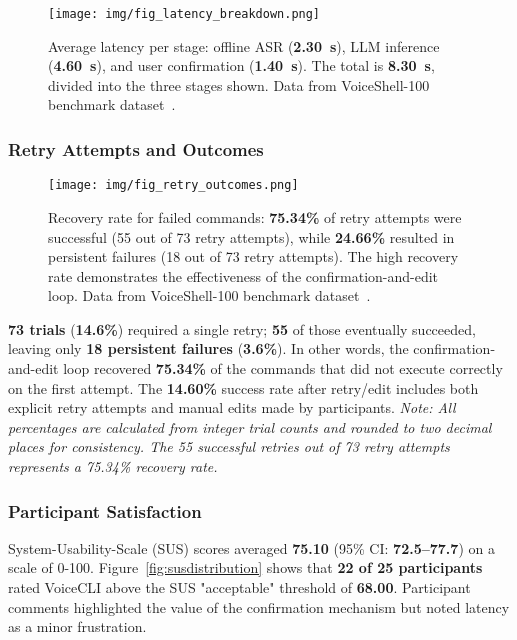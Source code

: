 \documentclass[a4paper,12pt]{article}
\begin{document}
\begin{figure}[htbp]
  \centering
  \texttt{[image: img/fig\_latency\_breakdown.png]}
  \caption{Average latency per stage: offline ASR (\textbf{2.30~s}), LLM inference (\textbf{4.60~s}), and user confirmation (\textbf{1.40~s}). The total is \textbf{8.30~s}, divided into the three stages shown. Data from VoiceShell-100 benchmark dataset~\cite{ref26,ref27}.}
  \label{fig:latencybreakdown}
\end{figure}

\subsubsection{Retry Attempts and Outcomes}

\begin{figure}[htbp]
  \centering
  \texttt{[image: img/fig\_retry\_outcomes.png]}
  \caption{Recovery rate for failed commands: \textbf{75.34\%} of retry attempts were successful (55 out of 73 retry attempts), while \textbf{24.66\%} resulted in persistent failures (18 out of 73 retry attempts). The high recovery rate demonstrates the effectiveness of the confirmation-and-edit loop. Data from VoiceShell-100 benchmark dataset~\cite{ref26,ref27}.}
  \label{fig:retryoutcomes}
\end{figure}

\noindent \textbf{73 trials} (\textbf{14.6\%}) required a single retry; \textbf{55} of those eventually succeeded, leaving only \textbf{18 persistent failures} (\textbf{3.6\%}). In other words, the confirmation-and-edit loop recovered \textbf{75.34\%} of the commands that did not execute correctly on the first attempt. The \textbf{14.60\%} success rate after retry/edit includes both explicit retry attempts and manual edits made by participants. \textit{Note: All percentages are calculated from integer trial counts and rounded to two decimal places for consistency. The 55 successful retries out of 73 retry attempts represents a 75.34\% recovery rate.}

\subsubsection{Participant Satisfaction}

\noindent System-Usability-Scale (SUS) scores averaged \textbf{75.10} (95\% CI: \textbf{72.5–77.7}) on a scale of 0-100. Figure~\ref{fig:susdistribution} shows that \textbf{22 of 25 participants} rated VoiceCLI above the SUS "acceptable" threshold of \textbf{68.00}. Participant comments highlighted the value of the confirmation mechanism but noted latency as a minor frustration.
\end{document}

